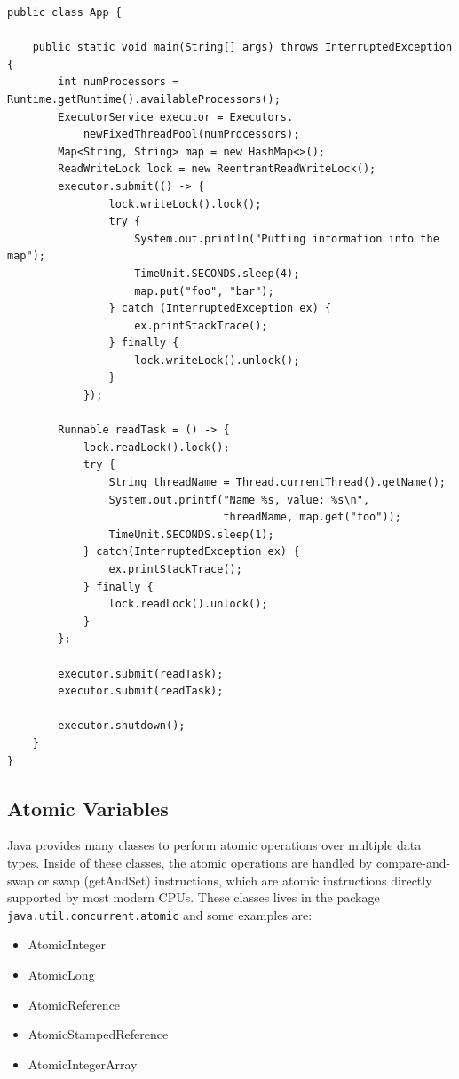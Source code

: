 \documentclass{latex/classes/thesis}
\begin{document}
\begin{enumerate}
\begin{lstlisting}
public class App {

    public static void main(String[] args) throws InterruptedException {
        int numProcessors = Runtime.getRuntime().availableProcessors();
        ExecutorService executor = Executors.
            newFixedThreadPool(numProcessors);
        Map<String, String> map = new HashMap<>();
        ReadWriteLock lock = new ReentrantReadWriteLock();
        executor.submit(() -> {
                lock.writeLock().lock();
                try {
                    System.out.println("Putting information into the map");
                    TimeUnit.SECONDS.sleep(4);
                    map.put("foo", "bar");
                } catch (InterruptedException ex) {
                    ex.printStackTrace();
                } finally {
                    lock.writeLock().unlock();
                }
            });

        Runnable readTask = () -> {
            lock.readLock().lock();
            try {
                String threadName = Thread.currentThread().getName();
                System.out.printf("Name %s, value: %s\n",
                                  threadName, map.get("foo"));
                TimeUnit.SECONDS.sleep(1);
            } catch(InterruptedException ex) {
                ex.printStackTrace();
            } finally {
                lock.readLock().unlock();
            }
        };

        executor.submit(readTask);
        executor.submit(readTask);

        executor.shutdown();
    }
}
\end{lstlisting}
\end{enumerate}

\subsection{Atomic Variables}
\label{sec:org555ecfa}

Java provides many classes to perform atomic operations over multiple data
types. Inside of these classes, the atomic operations are handled by
compare-and-swap or swap (getAndSet) instructions, which are atomic
instructions directly supported by most modern CPUs. These classes lives in
the package \texttt{java.util.concurrent.atomic} and some examples are:

\begin{itemize}
\item AtomicInteger
\item AtomicLong
\item AtomicReference
\item AtomicStampedReference
\item AtomicIntegerArray
\end{itemize}
\end{document}
